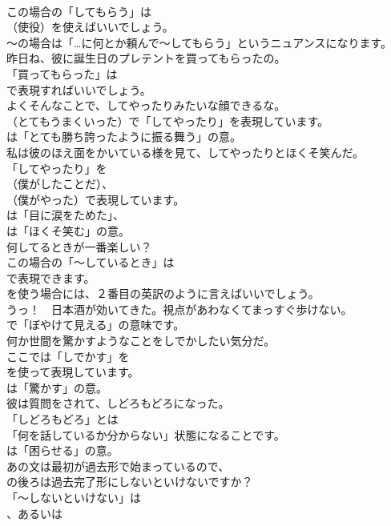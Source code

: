 \documentclass[8pt]{extreport}
\begin{document}
\begin{CJK}{UTF8}{min}
\\	この場合の「してもらう」は 
\\	（使役）を使えばいいでしょう。
\\	～の場合は「…に何とか頼んで～してもらう」というニュアンスになります。	
\\	昨日ね、彼に誕生日のプレテントを買ってもらったの。 
\\	「買ってもらった」は 
\\	で表現すればいいでしょう。	
\\	よくそんなことで、してやったりみたいな顔できるな。 
\\	（とてもうまくいった）で「してやったり」を表現しています。
\\	は「とても勝ち誇ったように振る舞う」の意。	
\\	私は彼のほえ面をかいている様を見て、してやったりとほくそ笑んだ。 
\\	「してやったり」を 
\\	（僕がしたことだ）、
\\	（僕がやった）で表現しています。
\\	は「目に涙をためた」、
\\	は「ほくそ笑む」の意。	
\\	何してるときが一番楽しい？ 
\\	この場合の「～しているとき」は
\\	で表現できます。
\\	を使う場合には、２番目の英訳のように言えばいいでしょう。	
\\	うっ！　日本酒が効いてきた。視点があわなくてまっすぐ歩けない。 
\\	で「ぼやけて見える」の意味です。	
\\	何か世間を驚かすようなことをしでかしたい気分だ。 
\\	ここでは「しでかす」を 
\\	を使って表現しています。
\\	は「驚かす」の意。	
\\	彼は質問をされて、しどろもどろになった。 
\\	「しどろもどろ」とは
\\	「何を話しているか分からない」状態になることです。
\\	は「困らせる」の意。	
\\	あの文は最初が過去形で始まっているので、
\\	の後ろは過去完了形にしないといけないですか？ 
\\	「～しないといけない」は 
\\	、あるいは 

\end{CJK}
\end{document}
